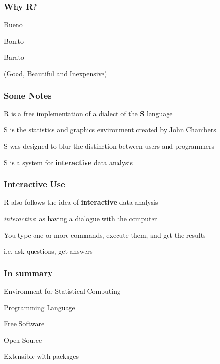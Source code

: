 \documentclass[12pt]{beamer}\usepackage[]{graphicx}\usepackage[]{color}
\begin{document}

\begin{frame}
\frametitle{Why R?}

\bbi
  \item Bueno
  \item Bonito
  \item Barato
\ei

\bigskip
(Good, Beautiful and Inexpensive)
\eb

\end{frame}


\begin{frame}
\frametitle{Some Notes}

\bbi
  \item R is a free implementation of a dialect of the \textbf{S} language
  \item S is the statistics and graphics environment created by John Chambers 
  \item S was designed to blur the distinction between users and programmers
  \item S is a system for \textbf{interactive} data analysis
\ei

\end{frame}


\begin{frame}
\frametitle{Interactive Use}

\bbi
  \item R also follows the idea of \textbf{interactive} data analysis
  \item \textit{interactive}: as having a dialogue with the computer
  \item You type one or more commands, execute them, and get the results
  \item i.e. ask questions, get answers
\ei

\end{frame}


\begin{frame}
\frametitle{In summary}

\bi
  \item Environment for Statistical Computing
  \item Programming Language
  \item Free Software
  \item Open Source
  \item Extensible with packages
\ei

\end{frame}
\end{document}
